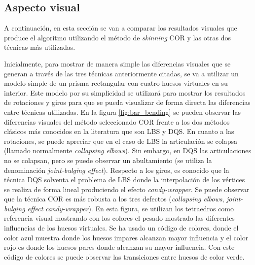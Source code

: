 \subsection{Aspecto visual} 
A continuación, en esta sección se van a comparar los resultados visuales que produce el algoritmo utilizando el método de \emph{skinning} \ac{COR} y las otras dos técnicas más utilizadas. 


Inicialmente, para mostrar de manera simple las diferencias visuales que se generan a través de las tres técnicas anteriormente citadas, se va a utilizar un modelo simple de un prisma rectangular con cuatro huesos virtuales en su interior. Este modelo por su simplicidad se utilizará para mostrar los resultados de rotaciones y giros para que se pueda visualizar de forma directa las diferencias entre técnicas utilizadas. En la figura \ref{fig:bar_bending} se pueden observar las diferencias visuales del método seleccionado \ac{COR} frente a los dos métodos clásicos más conocidos en la literatura que son \ac{LBS} y \ac{DQS}. En cuanto a las rotaciones, se puede apreciar que en el caso de \ac{LBS} la articulación se colapsa (llamado normalmente \emph{collapsing elbows}). Sin embargo, en \ac{DQS} las articulaciones no se colapsan, pero se puede observar un abultamiento (se utiliza la denominación \emph{joint-bulging effect}). Respecto a los giros, es conocido que la técnica \ac{DQS} solventa el problema de \ac{LBS} donde la interpolación de los vértices se realiza de forma lineal produciendo el efecto \emph{candy-wrapper}. Se puede observar que la técnica \ac{COR} es más robusta a los tres defectos (\emph{collapsing elbows}, \emph{joint-bulging effect} \emph{candy-wrapper}). 
En esta figura, se utilizan los tetraedros como referencia visual mostrando con los colores el pesado mostrado las diferentes influencias de los huesos virtuales. Se ha usado un código de colores, donde el color azul muestra donde los huesos impares alcanzan mayor influencia y el color rojo es donde los huesos pares donde alcanzan su mayor influencia. Con este código de colores se puede observar las transiciones entre huesos de color verde.

